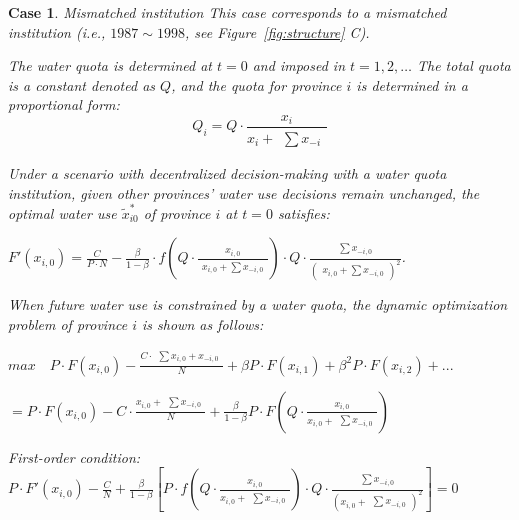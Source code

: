 \documentclass{article}
\newtheorem{case}{Case}
\begin{document}
\begin{case} Mismatched institution
    This case corresponds to a mismatched institution (i.e., $1987\sim1998$, see Figure~\ref{fig:structure} C).

    The water quota is determined at $t=0$ and imposed in $t=1,2,\ldots$ The total quota is a constant denoted as $Q$, and the quota for province $i$ is determined in a proportional form:
    $$Q_i=Q \cdot \frac{x_i}{x_i + \begin{matrix} \sum x_{-i} \end{matrix}}$$

    Under a scenario with decentralized decision-making with a water quota institution, given other provinces’ water use decisions remain unchanged, the optimal water use $\widetilde x_{i0}^*$ of province $i$ at $t=0$ satisfies:

    $F'(x_{i,0})=\frac{C}{P \cdot N} - \frac{\beta}{1-\beta} \cdot f(Q \cdot \frac{x_{i,0}}{\begin{matrix} x_{i,0} + \sum x_{-i,0} \end{matrix}}) \cdot Q \cdot \frac{\begin{matrix} \sum x_{-i,0} \end{matrix}}{(\begin{matrix} x_{i,0} + \sum x_{-i,0} \end{matrix})^2}$.

    When future water use is constrained by a water quota, the dynamic optimization problem of province $i$ is shown as follows:

    $max  \quad P \cdot F(x_{i,0})-\frac{C \cdot \begin{matrix} \sum x_{i,0} + x_{-i,0} \end{matrix}}{N}+\beta P \cdot F(x_{i,1})+\beta^2 P \cdot F(x_{i,2})+...$

    $=P \cdot F(x_{i,0})-C \cdot \frac{x_{i,0} + \begin{matrix} \sum x_{-i,0} \end{matrix}}{N}+\frac{\beta}{1-\beta} P \cdot F(Q \cdot \frac{x_{i,0}}{x_{i,0} + \begin{matrix} \sum x_{-i,0} \end{matrix}})$

    First-order condition: $P \cdot F'(x_{i,0})-\frac{C}{N}+\frac{\beta}{1-\beta}[P \cdot f(Q \cdot \frac{x_{i,0}}{x_{i,0} + \begin{matrix} \sum x_{-i,0} \end{matrix}}) \cdot Q \cdot \frac{\begin{matrix} \sum x_{-i,0} \end{matrix}}{(x_{i,0}+\begin{matrix} \sum  x_{-i,0} \end{matrix})^2}]=0$


\end{case}
\end{document}
